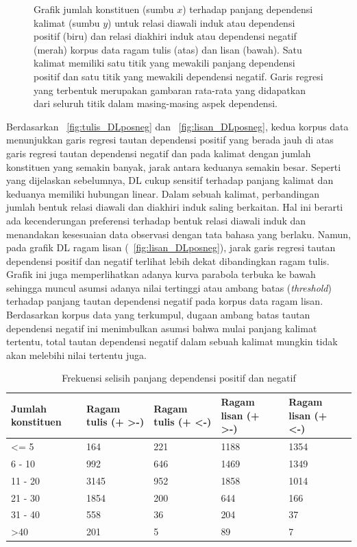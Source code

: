 \begin{figure}
\caption{Grafik jumlah konstituen (sumbu $x$) terhadap panjang dependensi kalimat (sumbu $y$) untuk relasi diawali induk atau dependensi positif (biru) dan relasi diakhiri induk atau dependensi negatif (merah) korpus data ragam tulis (atas) dan lisan (bawah). Satu kalimat memiliki satu titik yang mewakili panjang dependensi positif dan satu titik yang mewakili dependensi negatif. Garis regresi yang terbentuk merupakan gambaran rata-rata yang didapatkan dari seluruh titik dalam masing-masing aspek dependensi.}
\label{fig:DL_posneg}
\end{figure}

Berdasarkan \pic~\ref{fig:tulis_DLposneg} dan \pic~\ref{fig:lisan_DLposneg}, kedua korpus data menunjukkan garis regresi tautan dependensi positif yang berada jauh di atas garis regresi tautan dependensi negatif dan pada kalimat dengan jumlah konstituen yang semakin banyak, jarak antara keduanya semakin besar. Seperti yang dijelaskan sebelumnya, DL cukup sensitif terhadap panjang kalimat dan keduanya memiliki hubungan linear. Dalam sebuah kalimat, perbandingan jumlah bentuk relasi diawali dan diakhiri induk saling berkaitan. Hal ini berarti ada kecenderungan preferensi terhadap bentuk relasi diawali induk dan menandakan kesesuaian data observasi dengan tata bahasa yang berlaku. Namun, pada grafik DL ragam lisan (\pic~\ref{fig:lisan_DLposneg}), jarak garis regresi tautan dependensi positif dan negatif terlihat lebih dekat dibandingkan ragam tulis. Grafik ini juga memperlihatkan adanya kurva parabola terbuka ke bawah sehingga muncul asumsi adanya nilai tertinggi atau ambang batas (\textit{threshold}) terhadap panjang tautan dependensi negatif pada korpus data ragam lisan. Berdasarkan korpus data yang terkumpul, dugaan ambang batas tautan dependensi negatif ini menimbulkan asumsi bahwa mulai panjang kalimat tertentu, total tautan dependensi negatif dalam sebuah kalimat mungkin tidak akan melebihi nilai tertentu juga. 

\begin{table}
\begin{center}
\begin{small}
\caption{Frekuensi selisih panjang dependensi positif dan negatif}  \label{tab:DLposneg}
\begin{tabular}{ | p{2cm} | p{2cm} | p{2cm} | p{2cm} | p{2cm} |}
\hline
Jumlah konstituen & Ragam tulis (+ \textgreater -) & Ragam tulis (+ \textless -) & Ragam lisan (+ \textgreater -) & Ragam lisan (+ \textless -) \\ \hline
\textless= 5 & 164 & 221 & 1188 & 1354 \\ \hline
6 - 10 & 992 & 646 &1469 & 1349 \\ \hline
11 - 20 & 3145 & 952 & 1858 & 1014 \\ \hline
21 - 30 & 1854 & 200 & 644 & 166 \\ \hline
31 - 40 & 558 & 36 & 204 & 37 \\ \hline
\textgreater 40 & 201 & 5 & 89 & 7 \\ \hline
 \end{tabular}
 \end{small}
 \end{center}
 \end{table}
 

